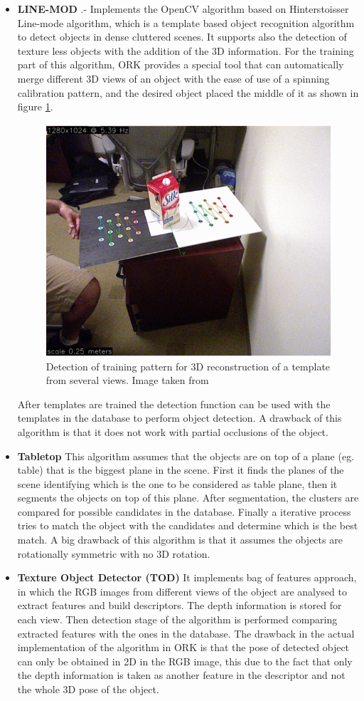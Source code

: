 \documentclass[fontsize=12pt]{article}
\begin{document}
\begin{itemize}
\item \textbf{LINE-MOD} .- Implements the OpenCV algorithm based on Hinterstoisser Line-mode \cite{bib:linmode} algorithm, which is a template based object recognition algorithm to detect objects in dense cluttered scenes. It supports also the detection of texture less objects with the addition of the 3D information. For the training part of this algorithm, ORK provides a special tool that can automatically merge different 3D views of an object with the ease of use of a spinning calibration pattern, and the desired object placed the middle  of it as shown in figure \ref{fig:calibpat}. 
\begin{figure}[H]
\begin{center}
\includegraphics[width=0.5\linewidth]{images/spintable}
\caption{Detection of training pattern for 3D reconstruction of a template from several views. Image taken from \cite{bib:ORK}}
\label{fig:calibpat}
\end{center}
\end{figure}
After templates are trained the detection function can be used with the templates in the database to perform object detection. A drawback of this algorithm is that it does not work with partial occlusions of the object. 
\item \textbf{Tabletop} This algorithm assumes that the objects are on top of a plane (eg. table) that is the biggest plane in the scene. First it finds the planes of the scene identifying which is the one to be considered as table plane, then it segments the objects on top of this plane. After segmentation, the clusters are compared for possible candidates in the database. Finally a iterative process tries to match the object with the candidates and determine which is the best match. A big drawback of this algorithm is that it assumes the objects are rotationally symmetric with no 3D rotation. 
\item\textbf{Texture Object Detector (TOD)} It implements bag of features approach, in which the RGB images from different views of the object are analysed to extract features and build descriptors. The depth information is stored for each view. Then detection stage of the algorithm is performed comparing extracted features with the ones in the database. The drawback in the actual implementation of the algorithm in ORK is that  the pose of detected object can only be obtained in 2D in the RGB image, this due to the fact that only the depth information is taken as another feature in the descriptor and not the whole 3D pose of the object. 

\end{itemize}
\end{document}
